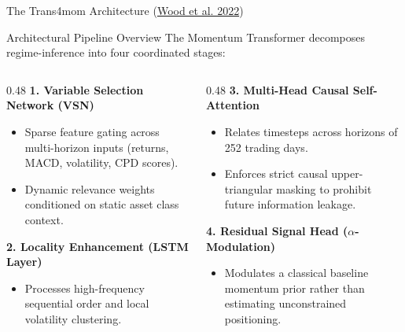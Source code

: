 \documentclass[10pt]{beamer}
\begin{document}
\begin{frame}{The Trans4mom Architecture (\href{https://arxiv.org/abs/2112.08534}{Wood et al. 2022})}
  \begin{block}{Architectural Pipeline Overview}
    The Momentum Transformer decomposes regime-inference into four coordinated stages:
  \end{block}
  \vspace{0.1cm}
  \begin{columns}[t]
    \begin{column}{0.48\textwidth}
      \textbf{\scriptsize 1. Variable Selection Network (VSN)}
      \begin{itemize}\scriptsize
        \item Sparse feature gating across multi-horizon inputs (returns, MACD, volatility, CPD scores).
        \item Dynamic relevance weights conditioned on static asset class context.
      \end{itemize}
      \vspace{0.05cm}
      \textbf{\scriptsize 2. Locality Enhancement (LSTM Layer)}
      \begin{itemize}\scriptsize
        \item Processes high-frequency sequential order and local volatility clustering.
      \end{itemize}
    \end{column}
    \begin{column}{0.48\textwidth}
      \textbf{\scriptsize 3. Multi-Head Causal Self-Attention}
      \begin{itemize}\scriptsize
        \item Relates timesteps across horizons of 252 trading days.
        \item Enforces strict causal upper-triangular masking to prohibit future information leakage.
      \end{itemize}
      \vspace{0.05cm}
      \textbf{\scriptsize 4. Residual Signal Head ($\alpha$-Modulation)}
      \begin{itemize}\scriptsize
        \item Modulates a classical baseline momentum prior rather than estimating unconstrained positioning.
      \end{itemize}
    \end{column}
  \end{columns}
\end{frame}
\end{document}
